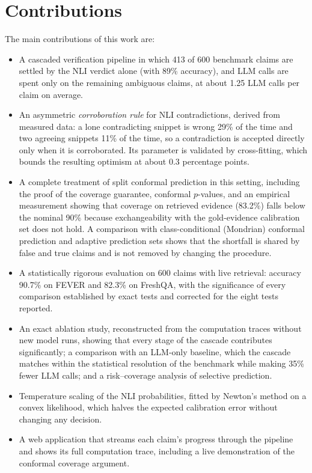 \section{Contributions}

The main contributions of this work are:
\begin{itemize}[itemsep=0.2em]
  \item A cascaded verification pipeline in which 413 of 600 benchmark claims are settled by the NLI verdict alone (with 89\% accuracy), and LLM calls are spent only on the remaining ambiguous claims, at about 1.25 LLM calls per claim on average.
  \item An asymmetric \emph{corroboration rule} for NLI contradictions, derived from measured data: a lone contradicting snippet is wrong 29\% of the time and two agreeing snippets 11\% of the time, so a contradiction is accepted directly only when it is corroborated. Its parameter is validated by cross-fitting, which bounds the resulting optimism at about 0.3 percentage points.
  \item A complete treatment of split conformal prediction in this setting, including the proof of the coverage guarantee, conformal $p$-values, and an empirical measurement showing that coverage on retrieved evidence (83.2\%) falls below the nominal 90\% because exchangeability with the gold-evidence calibration set does not hold. A comparison with class-conditional (Mondrian) conformal prediction and adaptive prediction sets shows that the shortfall is shared by false and true claims and is not removed by changing the procedure.
  \item A statistically rigorous evaluation on 600 claims with live retrieval: accuracy 90.7\% on FEVER and 82.3\% on FreshQA, with the significance of every comparison established by exact tests and corrected for the eight tests reported.
  \item An exact ablation study, reconstructed from the computation traces without new model runs, showing that every stage of the cascade contributes significantly; a comparison with an LLM-only baseline, which the cascade matches within the statistical resolution of the benchmark while making 35\% fewer LLM calls; and a risk--coverage analysis of selective prediction.
  \item Temperature scaling of the NLI probabilities, fitted by Newton's method on a convex likelihood, which halves the expected calibration error without changing any decision.
  \item A web application that streams each claim's progress through the pipeline and shows its full computation trace, including a live demonstration of the conformal coverage argument.
\end{itemize}


